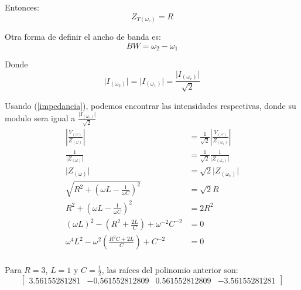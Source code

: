 \documentclass[a4paper,12pt]{report}
\begin{document}
\begin{enumerate}[label=\alph*), left=0pt]
                Entonces:
                \begin{equation*}
                    Z_{T(\omega_c)} = R
                \end{equation*}

                Otra forma de definir el ancho de banda es:
                \begin{equation}
                    \label{ancho.de.banda.2}
                    BW = \omega_2 - \omega_1
                \end{equation}

                Donde
                \begin{equation*}
                    \lvert I_{(\omega_2)} \rvert = \lvert I_{(\omega_1)} \rvert = \frac{\lvert I_{(\omega_c)} \rvert}
                        {\sqrt{2}}
                \end{equation*}

                Usando (\ref{impedancia}), podemos encontrar las intensidades respectivas, donde su modulo sera igual a
                $\frac{\lvert I_{(\omega_c)} \rvert}{\sqrt{2}}$
                \begin{align*}
                    \left\lvert \frac{V_{(\omega)}}{Z_{(\omega)}} \right\rvert &=
                        \frac{1}{\sqrt{2}} \left\lvert \frac{V_{(\omega)}}{Z_{(\omega_c)}} \right\rvert\\
                    \frac{1}{\lvert Z_{(\omega)} \rvert} &= \frac{1}{\sqrt{2}} \frac{1}{\lvert Z_{(\omega_c)} \rvert}\\
                    \lvert Z_{(\omega)} \rvert &= \sqrt{2} \lvert Z_{(\omega_c)} \rvert\\
                    \sqrt{R^2 + \left(\omega L - \frac{1}{\omega C}\right)^2} &= \sqrt{2} R\\
                    R^2 + \left(\omega L - \frac{1}{\omega C}\right)^2 &= 2 R^2\\
                    (\omega L)^2 - \left(R^2 + \frac{2 L}{C}\right) + \omega^{-2} C^{-2} &= 0\\
                    \omega^4 L^2 - \omega^2 \left(\frac{R^2 C + 2 L}{C}\right) + C^{-2} &= 0\\
                \end{align*}

                Para $R=3$, $L=1$ y $C=\frac{1}{2}$, las raíces del polinomio anterior son:
                \begin{equation*}
                    \begin{bmatrix}
                        3.56155281281 & -0.561552812809 & 0.561552812809 & -3.56155281281
                    \end{bmatrix}
                \end{equation*}


\end{enumerate}
\end{document}
